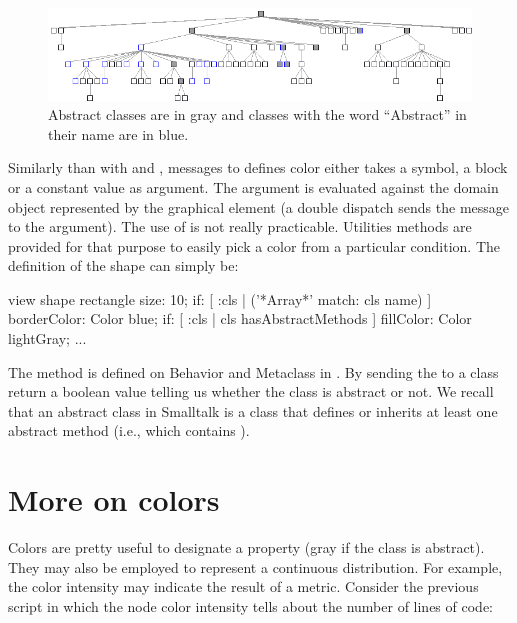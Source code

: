 \documentclass[a4paper,10pt,twoside]{book}
\begin{document}
\begin{figure}[htbp]
\centerline{\includegraphics[width=\linewidth]{arrayClasses}}
\caption{Abstract classes are in gray and classes with the word ``Abstract'' in their name are in blue.}
\label{fig:abstractClasses}
\end{figure}

Similarly than with  and , messages to defines color either takes a symbol, a block or a constant value as argument. The argument is evaluated against the domain object represented by the graphical element (a double dispatch sends the message  to the argument). 
The use of  is not really practicable. Utilities methods are provided for that purpose to easily pick a color from a particular condition. The definition of the shape can simply be:

\begin{code}{}
view shape rectangle
	size: 10;
	if: [ :cls | ('*Array*' match: cls name) ] borderColor: Color blue;
	if: [ :cls | cls hasAbstractMethods ] fillColor: Color lightGray;
...
\end{code}

The method  is defined on Behavior and Metaclass in \pharo. By sending the  to a class return a boolean value telling us whether the class is abstract or not. We recall that an abstract class in Smalltalk is a class that defines or inherits at least one  abstract method (i.e., which contains ).



\section{More on colors}

Colors are pretty useful to designate a property (\eg gray if the class is abstract). They may also be employed to represent a continuous distribution. For example, the color intensity may indicate the result of a metric. Consider the previous script in which the node color intensity tells about the number of lines of code:
\end{document}
